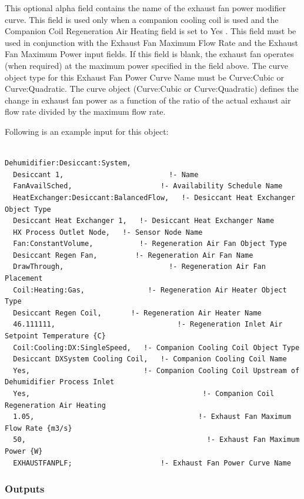 This optional alpha field contains the name of the exhaust fan power modifier curve. This field is used only when a companion cooling coil is used and the Companion Coil Regeneration Air Heating field is set to Yes . This field must be used in conjunction with the Exhaust Fan Maximum Flow Rate and the Exhaust Fan Maximum Power input fields. If this field is blank, the exhaust fan operates (when required) at the maximum power specified in the field above. The curve object type for this Exhaust Fan Power Curve Name must be Curve:Cubic or Curve:Quadratic. The curve object (Curve:Cubic or Curve:Quadratic) defines the change in exhaust fan power as a function of the ratio of the actual exhaust air flow rate divided by the maximum flow rate.

Following is an example input for this object:

\begin{lstlisting}

Dehumidifier:Desiccant:System,
  Desiccant 1,                         !- Name
  FanAvailSched,                     !- Availability Schedule Name
  HeatExchanger:Desiccant:BalancedFlow,   !- Desiccant Heat Exchanger Object Type
  Desiccant Heat Exchanger 1,   !- Desiccant Heat Exchanger Name
  HX Process Outlet Node,   !- Sensor Node Name
  Fan:ConstantVolume,           !- Regeneration Air Fan Object Type
  Desiccant Regen Fan,         !- Regeneration Air Fan Name
  DrawThrough,                         !- Regeneration Air Fan Placement
  Coil:Heating:Gas,               !- Regeneration Air Heater Object Type
  Desiccant Regen Coil,       !- Regeneration Air Heater Name
  46.111111,                             !- Regeneration Inlet Air Setpoint Temperature {C}
  Coil:Cooling:DX:SingleSpeed,   !- Companion Cooling Coil Object Type
  Desiccant DXSystem Cooling Coil,   !- Companion Cooling Coil Name
  Yes,                           !- Companion Cooling Coil Upstream of Dehumidifier Process Inlet
  Yes,                                         !- Companion Coil Regeneration Air Heating
  1.05,                                       !- Exhaust Fan Maximum Flow Rate {m3/s}
  50,                                           !- Exhaust Fan Maximum Power {W}
  EXHAUSTFANPLF;                     !- Exhaust Fan Power Curve Name
\end{lstlisting}

\subsubsection{Outputs}\label{outputs-1-006}

